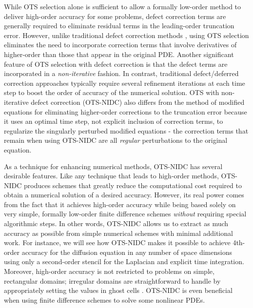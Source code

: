 \documentclass[fleqn,12pt,twoside]{article}
\begin{document}
While OTS selection alone is sufficient to allow a formally low-order method to
deliver high-order accuracy for some problems, defect correction terms are
generally required to eliminate residual terms in the leading-order truncation
error.  However, unlike traditional defect correction 
methods \cite{pereyra_1968,stetter_1978,gustafsson_2002,kress_2002,kress_2006}, 
using OTS selection eliminates the need to incorporate correction terms that
involve derivatives of higher-order than those that appear in the original PDE.
Another significant feature of OTS selection with defect correction
is that the defect terms are incorporated in a \emph{non-iterative} fashion.
In contrast, traditional defect/deferred correction approaches typically
require several refinement iterations at each time step to boost the order of
accuracy of the numerical solution.  OTS with non-iterative defect correction
(OTS-NIDC) also differs from the method of modified
equations \cite{griffiths_1986} for eliminating higher-order
corrections to the truncation error because it uses an optimal time
step, not explicit inclusion of correction terms, to regularize the
singularly perturbed modified equations - the correction terms that remain
when using OTS-NIDC are all \emph{regular} perturbations to the original
equation.

As a technique for enhancing numerical methods, OTS-NIDC has several desirable
features.  Like any technique that leads to high-order methods, OTS-NIDC
produces schemes that greatly reduce the computational cost required to obtain
a numerical solution of a desired accuracy.  However, its real power comes
from the fact that it achieves high-order accuracy while being based solely on
very simple, formally low-order finite difference schemes \emph{without}
requiring special algorithmic steps.  In other words, OTS-NIDC allows us to
extract as much accuracy as possible from simple numerical schemes with
minimal additional work.  For instance, we will see how OTS-NIDC makes it
possible to achieve 4th-order accuracy for the diffusion equation in any
number of space dimensions using only a second-order stencil for the Laplacian
and explicit time integration.  Moreover, high-order accuracy is not
restricted to problems on simple, rectangular domains; irregular domains are
straightforward to handle by appropriately setting the values in ghost
cells \cite{gibou_2005,ito_2005,fedkiw_1999,osher_fedkiw_book}.  
OTS-NIDC is even beneficial when using finite difference schemes to solve
some nonlinear PDEs.  
\end{document}
